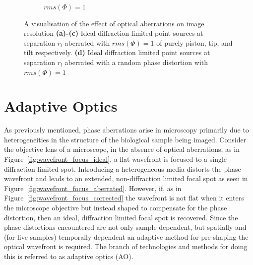 \begin{figure}
\begin{subfigure}{0.49\textwidth}
		\caption{$rms(\Phi) = 1$}
		\label{fig:Airy_ring_2D_2_object_seperation_aberration_comparison_rms_1}
	\end{subfigure}
	\caption[A visualisation of the effect of optical aberrations on image 
	resolution]{A visualisation of the effect of optical aberrations on 
		image resolution \textbf{(a)-(c)} Ideal diffraction limited point 
		sources at separation $r_{l}$ aberrated with $rms(\Phi) = 1$ of purely 
		piston, tip, and tilt respectively. \textbf{(d)} Ideal diffraction 
		limited point sources at separation $r_{l}$ aberrated with a random 
		phase distortion with $rms(\Phi) = 1$}
	\label{fig:aberrations_res}
\end{figure}

\section{Adaptive Optics}
\label{sec:AO}

As previously mentioned, phase aberrations arise in microscopy primarily
due to heterogeneities in the structure of the biological sample being 
imaged. Consider the objective lens of a microscope, in the absence of
optical aberrations, as in Figure~\ref{fig:wavefront_focus_ideal}, a flat
wavefront is focused to a single diffraction limited spot. Introducing
a heterogeneous media distorts the phase wavefront and leads to an 
extended, non-diffraction limited focal spot as seen in 
Figure~\ref{fig:wavefront_focus_aberrated}. However, if, as in 
Figure~\ref{fig:wavefront_focus_corrected} the wavefront is not flat when 
it enters the microscope objective but instead shaped to compensate for 
the phase distortion, then an ideal, diffraction limited focal spot is 
recovered. Since the phase distortions encountered are not only sample
dependent, but spatially and (for live samples) temporally dependent an
adaptive method for pre-shaping the optical wavefront is 
required\cite{schwertner2004characterizing,wang2014multiplexed,girkin2009adaptive}.
The branch of technologies and methods for doing this is referred to as
adaptive optics (AO).

